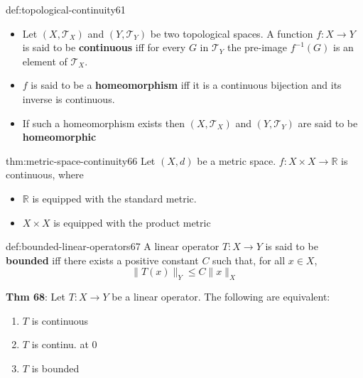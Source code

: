 \documentclass[landscape, 8pt]{extarticle}
\begin{document}
\begin{multicols}{3}
\begin{dfn}{def:topological-continuity}{61}
    \vspace{-5pt}
    \begin{itemize}[leftmargin=*]
        \item Let $(X, \mathcal{T}_{X})$ and $(Y, \mathcal{T}_{Y})$ be two topological spaces. A function $f : X \to Y$ is said to be \textbf{continuous} iff for every $G$ in $\mathcal{T}_{Y}$ the pre-image $f^{-1}(G)$ is an element of $\mathcal{T}_{X}$.
        \item $f$ is said to be a \textbf{homeomorphism} iff it is a continuous bijection and its inverse is continuous.
        \item If such a homeomorphism exists then $(X, \mathcal{T}_{X})$ and $(Y, \mathcal{T}_{Y})$ are said to be \textbf{homeomorphic}
    \end{itemize}
\end{dfn}

\begin{thm}{thm:metric-space-continuity}{66}
    \vspace{-5pt}
    Let $(X, d)$ be a metric space. $f: X \times X \to \mathbb{R} $ is continuous, where

    \vspace{-5pt}
    \begin{itemize}
        \item $\mathbb{R}$ is equipped with the standard metric.
        \item $X \times X$ is equipped with the product metric
    \end{itemize}

     
\end{thm}

\begin{dfn}{def:bounded-linear-operators}{67}
    \vspace{-5pt}
    A linear operator $T : X \to Y$ is said to be \textbf{bounded} iff there exists a positive constant $C$ such that, for all $x\in X$,
    \[\lVert T(x) \rVert_{Y} \le C \lVert x \rVert_{X}\]

    \longrule{0.08ex}
    \textbf{Thm 68}: Let $T: X \to Y $ be a linear operator. The following are equivalent:
    \vspace{-13pt}
    \begin{multicols}{3}
    \begin{enumerate}[leftmargin=*]
        \item $T$ is continuous
        \item $T$ is continu. at $0$
        \item $T$ is bounded
    \end{enumerate}
    \end{multicols}
\end{dfn}


\end{multicols}
\end{document}
